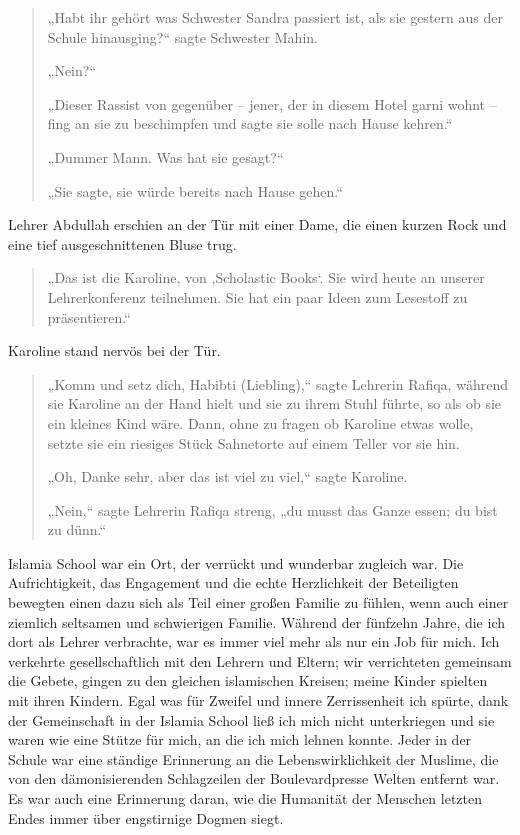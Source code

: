 \documentclass[12pt]{memoir}
\begin{document}
\begin{quote}
„Habt ihr gehört was Schwester Sandra passiert ist,
als sie gestern aus der Schule hinausging?“ sagte Schwester Mahin.

„Nein?“

„Dieser Rassist von gegenüber – jener, der in diesem Hotel garni wohnt –
fing an sie zu beschimpfen und sagte sie solle nach Hause kehren.“

„Dummer Mann. Was hat sie gesagt?“

„Sie sagte, sie würde bereits nach Hause gehen.“
\end{quote}

Lehrer Abdullah erschien an der Tür mit einer Dame,
die einen kurzen Rock und eine tief ausgeschnittenen Bluse trug.

\begin{quote}
„Das ist die Karoline, von ‚Scholastic Books‘.
Sie wird heute an unserer Lehrerkonferenz teilnehmen.
Sie hat ein paar Ideen zum Lesestoff zu präsentieren.“
\end{quote}

Karoline stand nervös bei der Tür.

\begin{quote}
„Komm und setz dich, Habibti (Liebling),“ sagte Lehrerin Rafiqa,
während sie Karoline an der Hand hielt und sie zu ihrem Stuhl führte,
so als ob sie ein kleines Kind wäre.
Dann, ohne zu fragen ob Karoline etwas wolle,
setzte sie ein riesiges Stück Sahnetorte auf einem Teller vor sie hin.

„Oh, Danke sehr, aber das ist viel zu viel,“ sagte Karoline.

„Nein,“ sagte Lehrerin Rafiqa streng,
„du musst das Ganze essen; du bist zu dünn.“
\end{quote}

Islamia School war ein Ort, der verrückt und wunderbar zugleich war.
Die Aufrichtigkeit, das Engagement und die echte Herzlichkeit der Beteiligten
bewegten einen dazu sich als Teil einer großen Familie zu fühlen,
wenn auch einer ziemlich seltsamen und schwierigen Familie.
Während der fünfzehn Jahre, die ich dort als Lehrer verbrachte,
war es immer viel mehr als nur ein Job für mich.
Ich verkehrte gesellschaftlich mit den Lehrern und Eltern;
wir verrichteten gemeinsam die Gebete,
gingen zu den gleichen islamischen Kreisen;
meine Kinder spielten mit ihren Kindern.
Egal was für Zweifel und innere Zerrissenheit ich spürte,
dank der Gemeinschaft in der Islamia School ließ ich mich nicht unterkriegen
und sie waren wie eine Stütze für mich, an die ich mich lehnen konnte.
Jeder in der Schule war eine ständige Erinnerung
an die Lebenswirklichkeit der Muslime,
die von den dämonisierenden Schlagzeilen
der Boulevardpresse Welten entfernt war.
Es war auch eine Erinnerung daran,
wie die Humanität der Menschen letzten Endes immer
über engstirnige Dogmen siegt.
\end{document}

